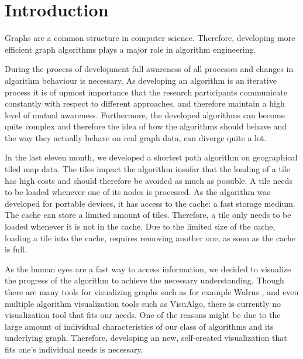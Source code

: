 \documentclass
[
    paper = a4,
    pagesize,
    12 pt,
    oneside,                       %
    open = right,
    DIV = calc,
    BCOR = 0 mm,                   %
    bibtotoc
]
{scrbook}
\begin{document}
\frontmatter







\mainmatter
\chapter{Introduction} \label{introduction}
Graphs are a common structure in computer science.
Therefore, developing more efficient graph algorithms plays a major role in algorithm engineering.

During the process of development full awareness of all processes and changes in algorithm behaviour is necessary.
As developing an algorithm is an iterative process it is of upmost importance that the research participants communicate constantly with respect to different approaches, and therefore maintain a high level of mutual awareness.
Furthermore, the developed algorithms can become quite complex and therefore the idea of how the algorithms should behave and the way they actually behave on real graph data, can diverge quite a lot.

In the last eleven month, we developed a shortest path algorithm on geographical tiled map data.
The tiles impact the algorithm insofar that the loading of a tile has high costs and should therefore be avoided as much as possible.
A tile needs to be loaded whenever one of its nodes is processed.
As the algorithm was developed for portable devices, it has access to the cache: a fast storage medium.
The cache can store a limited amount of tiles.
Therefore, a tile only needs to be loaded whenever it is not in the cache.
Due to the limited size of the cache, loading a tile into the cache, requires removing another one, as soon as the cache is full.

As the human eyes are a fast way to access information, we decided to visualize the progress of the algorithm to achieve the necessary understanding.
Though there are many tools for visualizing graphs such as for example Walrus \cite{walrus}, and even multiple algorithm visualization tools such as VisuAlgo\cite{visualgo}, there is currently no visualization tool that fits our needs.
One of the reasons might be due to the large amount of individual characteristics of our class of algorithms and its underlying graph.
Therefore, developing an new, self-created visualization that fits one's individual needs is necessary.
\end{document}
